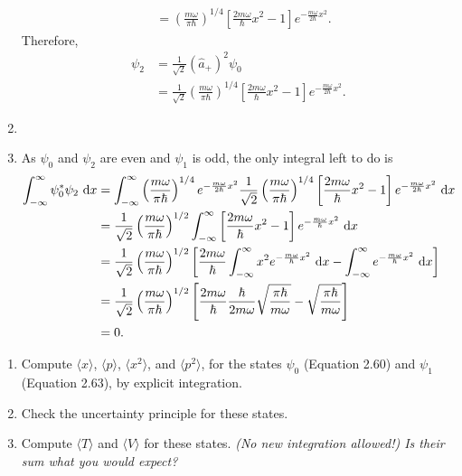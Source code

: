 \documentclass[en, oneside]{vivi}
\begin{document}
\begin{sol}
\begin{enumerate}[label=(\alph*)]
\begin{align*}
            &= \left( \frac{m \omega}{\pi \hbar} \right)^{1/4} \left[\frac{2 m \omega}{\hbar} x^2 - 1\right] e^{-\frac{m \omega}{2\hbar}x^2}.
        \end{align*}
        Therefore,
        \begin{align*}
            \psi_2 &= \frac{1}{\sqrt{2}} \left( \hat a_+ \right)^2 \psi_0\\
            &= \frac{1}{\sqrt{2}} \left( \frac{m \omega}{\pi \hbar} \right)^{1/4} \left[\frac{2 m \omega}{\hbar} x^2 - 1\right] e^{-\frac{m \omega}{2\hbar}x^2}.
        \end{align*}
        \item 
        \item As $\psi_0$ and $\psi_2$ are even and $\psi_1$ is odd, the only integral left to do is
        \begin{align*}
            \int_{-\infty}^{\infty} \psi_0^* \psi_2 \dif x &= \int_{-\infty}^{\infty} \left( \frac{m \omega}{\pi \hbar} \right)^{1/4} e^{-\frac{m \omega}{2\hbar}x^2} \frac{1}{\sqrt{2}} \left( \frac{m \omega}{\pi \hbar} \right)^{1/4} \left[\frac{2 m \omega}{\hbar} x^2 - 1\right] e^{-\frac{m \omega}{2\hbar}x^2} \dif x\\
            &= \frac{1}{\sqrt{2}} \left( \frac{m \omega}{\pi \hbar} \right)^{1/2} \int_{-\infty}^{\infty} \left[\frac{2 m \omega}{\hbar} x^2 - 1\right] e^{-\frac{m \omega}{\hbar}x^2} \dif x\\
            &= \frac{1}{\sqrt{2}} \left( \frac{m \omega}{\pi \hbar} \right)^{1/2} \left[ \frac{2 m \omega}{\hbar} \int_{-\infty}^{\infty} x^2 e^{-\frac{m \omega}{\hbar}x^2} \dif x - \int_{-\infty}^{\infty} e^{-\frac{m \omega}{\hbar}x^2} \dif x \right]\\
            &= \frac{1}{\sqrt{2}} \left( \frac{m \omega}{\pi \hbar} \right)^{1/2} \left[ \frac{2 m \omega}{\hbar} \frac{\hbar}{2 m \omega} \sqrt{\frac{\pi \hbar}{m \omega}} - \sqrt{\frac{\pi \hbar}{m \omega}} \right]\\
            &= 0.
        \end{align*}
    \end{enumerate}
\end{sol}

\begin{prob}
    \bigskip
    \begin{enumerate}[label=(\alph*)]
        \item Compute $\langle x \rangle$, $\langle p \rangle$, $\langle x^2 \rangle$, and $\langle p^2 \rangle$, for the states $\psi_0$ (Equation 2.60) and $\psi_1$ (Equation 2.63), by explicit integration.
        \item Check the uncertainty principle for these states.
        \item Compute $\langle T \rangle$ and $\langle V \rangle$ for these states. 
        \textit{(No new integration allowed!) Is their sum what you would expect?}
    \end{enumerate}
\end{prob}
\end{document}
